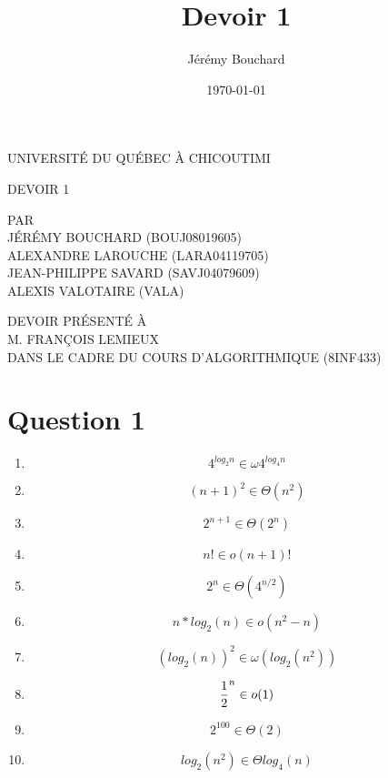 \documentclass[12pt]{article}
\title{Devoir 1}
\author{Jérémy Bouchard}
\date{\today}
\begin{document}
  \begin{titlepage}
    \doublespacing
    \centering

    UNIVERSITÉ DU QUÉBEC À CHICOUTIMI \\

    \vspace{4.7cm}

    DEVOIR 1 \\

    \vspace{4.7cm}

    PAR \\
    JÉRÉMY BOUCHARD (BOUJ08019605) \\
    ALEXANDRE LAROUCHE (LARA04119705) \\
    JEAN-PHILIPPE SAVARD (SAVJ04079609) \\
    ALEXIS VALOTAIRE (VALA) \\

    \vspace{4.7cm}

    DEVOIR PRÉSENTÉ À \\
    M. FRANÇOIS LEMIEUX \\
    DANS LE CADRE DU COURS D'ALGORITHMIQUE (8INF433)

  \end{titlepage}

  \newpage

  \newpage

  \onehalfspacing

  \section*{Question 1}

    \begin{enumerate}[label=(\alph*)]
      \item \[ 4 ^ {log_2 n} \in \omega 4 ^ {log_4 n} \]
      \item \[ (n + 1) ^ {2} \in \Theta (n ^ 2) \]
      \item \[ 2 ^ {n + 1} \in \Theta (2 ^ n) \]
      \item \[ n! \in o (n + 1)! \]
      \item \[ 2 ^ n \in \Theta (4 ^ {n / 2}) \]
      \item \[ n*log_2(n) \in o (n ^ 2 - n) \]
      \item \[ (log_2(n)) ^ 2 \in \omega (log_2(n^2)) \]
      \item \[ {1 \over 2} ^ {n} \in o (1) \]
      \item \[ 2^{100} \in \Theta(2) \]
      \item \[ log_2(n^2) \in \Theta log_4(n) \]
    \end{enumerate}
\end{document}
